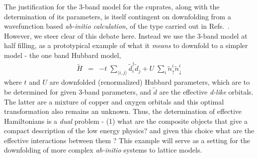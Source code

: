 \documentclass[prl,12pt,onecolumn,nofootinbib,notitlepage,english,superscriptaddress]{revtex4-1}
\begin{document}
The justification for the 3-band model for the cuprates, along with the determination of its parameters, 
is itself contingent on downfolding from a wavefunction based \emph{ab-initio calculation}, 
of the type carried out in Refs.~\cite{Wagner_Abbamonte}. However, we steer clear of this debate here. 
Instead we use the 3-band model at half filling, as a prototypical example of what it \emph{means} to downfold to 
a simpler model - the one band Hubbard model, 
\begin{eqnarray}
	\tilde{H} &=&  -t \;\sum_{\langle i,j \rangle} \tilde{d}_i^{\dagger} \tilde{d}_j + U \;\sum_{i} \tilde{n}^{i}_{\uparrow} \tilde{n}^{i}_{\downarrow}
\label{eq:oneband}
\end{eqnarray}
where $t$ and $U$ are downfolded (renormalized) Hubbard parameters, which are to 
be determined for given 3-band parameters, and $\tilde{d}$ are the effective \emph{d-like} orbitals. 
The latter are a mixture of copper and oxygen orbitals and this optimal transformation also remains an unknown. Thus, 
the determination of effective Hamiltonians is a \emph{dual} problem - (1) what are the composite objects that give a 
compact description of the low energy physics? and given this choice what are the effective interactions between them ?  
This example will serve as a setting for the downfolding of more complex \emph{ab-initio} systems to lattice 
models. 
\end{document}
